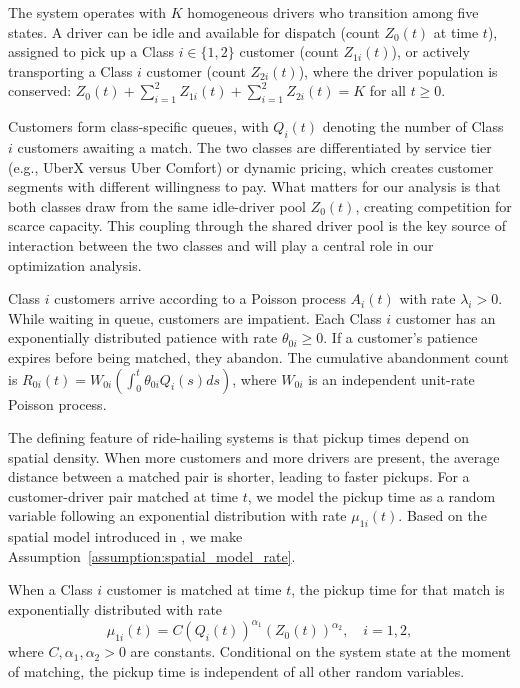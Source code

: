 The system operates with $K$ homogeneous drivers who transition among five states.
A driver can be idle and available for dispatch (count $Z_0(t)$ at time $t$), assigned to pick up a Class $i \in \{1,2\}$ customer (count $Z_{1i}(t)$), or actively transporting a Class $i$ customer (count $Z_{2i}(t)$), where the driver population is conserved: $Z_0(t) + \sum_{i=1}^2 Z_{1i}(t) + \sum_{i=1}^2 Z_{2i}(t) = K$ for all $t \geq 0$.

Customers form class-specific queues, with $Q_i(t)$ denoting the number of Class $i$ customers awaiting a match.
The two classes are differentiated by service tier (e.g., UberX versus Uber Comfort) or dynamic pricing, which creates customer segments with different willingness to pay.
What matters for our analysis is that both classes draw from the same idle-driver pool $Z_0(t)$, creating competition for scarce capacity.
This coupling through the shared driver pool is the key source of interaction between the two classes and will play a central role in our optimization analysis.

Class $i$ customers arrive according to a Poisson process $A_i(t)$ with rate $\lambda_i > 0$.
While waiting in queue, customers are impatient.
Each Class $i$ customer has an exponentially distributed patience with rate $\theta_{0i} \geq 0$.
If a customer's patience expires before being matched, they abandon.
The cumulative abandonment count is $R_{0i}(t) = W_{0i}(\int_0^t \theta_{0i} Q_i(s) ds)$, where $W_{0i}$ is an independent unit-rate Poisson process.

The defining feature of ride-hailing systems is that pickup times depend on spatial density.
When more customers and more drivers are present, the average distance between a matched pair is shorter, leading to faster pickups.
For a customer-driver pair matched at time $t$, we model the pickup time as a random variable following an exponential distribution with rate $\mu_{1i}(t)$.
Based on the spatial model introduced in \citet{WangZhangHu2024}, we make Assumption~\ref{assumption:spatial_model_rate}.

\begin{assumption}
\label{assumption:spatial_model_rate}
When a Class $i$ customer is matched at time $t$, the pickup time for that match is exponentially distributed with rate
\begin{equation}
\mu_{1i}(t) = C (Q_i(t))^{\alpha_1} (Z_0(t))^{\alpha_2}, \quad i=1, 2, \label{eq:spatial_model_rate}
\end{equation}
where $C, \alpha_1, \alpha_2 > 0$ are constants.
Conditional on the system state at the moment of matching, the pickup time is independent of all other random variables.
\end{assumption}

